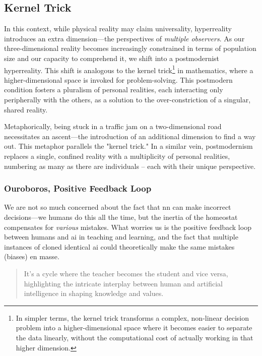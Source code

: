 \documentclass[11pt,a4]{article}
\begin{document}
    \subsection{Kernel Trick} \label{kerneltrick}

    In this context, while physical reality may claim universality, hyperreality\cite{BaudrillardSim}
    introduces an extra dimension---the perspectives of \textit{multiple observers}.
    As our three-dimensional reality becomes increasingly constrained
    in terms of population size and our capacity to comprehend it,
    we shift into a postmodernist hyperreality. This shift is analogous
    to the kernel trick\footnote{In simpler terms, the kernel trick
    transforms a complex, non-linear decision problem into a
    higher-dimensional space where it becomes easier to separate
    the data linearly, without the computational cost of actually
    working in that higher dimension.
    } in mathematics, where a higher-dimensional space is invoked
    for problem-solving.
    This postmodern condition fosters a pluralism of personal realities,
    each interacting only peripherally with the others, as a solution to
    the over-constriction of a singular, shared reality.

    Metaphorically, being stuck in a traffic jam on a two-dimensional
    road necessitates an ascent---the introduction of an additional
    dimension to find a way out. This metaphor parallels the "kernel trick."
    In a similar vein, postmodernism replaces a single, confined reality
    with a multiplicity of personal realities, numbering as many as
    there are individuals – each with their unique perspective.


    \subsubsection{Ouroboros, Positive Feedback Loop}
    We are not so much concerned about the fact that \acrshort{nn}  can make incorrect decisions---we humans do this all the time, but the inertia of the homeostat compensates for \textit{various} mistakes. What worries us is the positive feedback loop between humans and \acrshort{ai} in teaching and learning, and the fact that multiple instances of cloned identical \acrshort{ai} could theoretically make the same mistakes (biases) en masse.

    \begin{quote}
        It's a cycle where the teacher becomes the student and vice versa,
        highlighting the intricate interplay between human and artificial
        intelligence in shaping knowledge and values.
    \end{quote}
\end{document}

